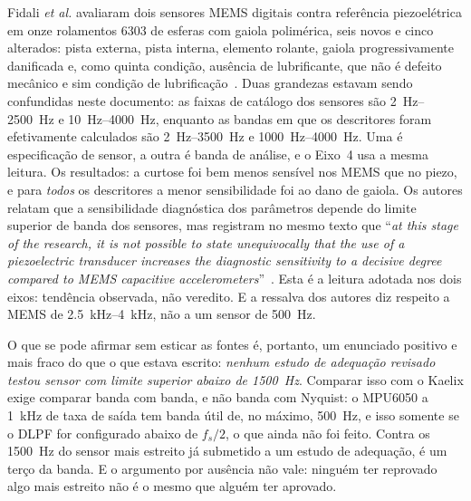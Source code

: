 \documentclass[11pt,a4paper]{article}
\begin{document}
Fidali \emph{et al.} avaliaram dois sensores MEMS digitais contra referência
piezoelétrica em onze rolamentos 6303 de esferas com gaiola polimérica, seis novos e
cinco alterados: pista externa, pista interna, elemento rolante, gaiola progressivamente
danificada e, como quinta condição, ausência de lubrificante, que não é defeito mecânico e
sim condição de lubrificação~\cite{fidali2024}. Duas grandezas estavam sendo confundidas
neste documento: as faixas de catálogo dos sensores são
\SIrange{2}{2500}{\hertz} e \SIrange{10}{4000}{\hertz}, enquanto as bandas em que os
descritores foram efetivamente calculados são \SIrange{2}{3500}{\hertz} e
\SIrange{1000}{4000}{\hertz}. Uma é especificação de sensor, a outra é banda de análise, e
o Eixo~4 usa a mesma leitura. Os resultados: a curtose foi bem menos sensível nos MEMS que
no piezo, e para \emph{todos} os descritores a menor sensibilidade foi ao dano de gaiola.
Os autores relatam que a sensibilidade diagnóstica dos parâmetros depende do limite
superior de banda dos sensores, mas registram no mesmo texto que ``\textit{at this stage
of the research, it is not possible to state unequivocally that the use of a piezoelectric
transducer increases the diagnostic sensitivity to a decisive degree compared to MEMS
capacitive accelerometers}''~\cite{fidali2024}. Esta é a leitura adotada nos dois eixos:
tendência observada, não veredito. E a ressalva dos autores diz respeito a MEMS de
\SIrange{2,5}{4}{\kilo\hertz}, não a um sensor de \SI{500}{\hertz}.

O que se pode afirmar sem esticar as fontes é, portanto, um enunciado positivo e mais
fraco do que o que estava escrito: \emph{nenhum estudo de adequação revisado testou sensor
com limite superior abaixo de \SI{1500}{\hertz}}. Comparar isso com o Kaelix exige
comparar banda com banda, e não banda com Nyquist: o MPU6050 a \SI{1}{\kilo\hertz} de taxa
de saída tem banda útil de, no máximo, \SI{500}{\hertz}, e isso somente se o DLPF for
configurado abaixo de $f_s/2$, o que ainda não foi feito. Contra os \SI{1500}{\hertz}
do sensor mais estreito já submetido a um estudo de adequação, é um terço da banda. E o
argumento por ausência não vale: ninguém ter reprovado algo mais estreito não é o mesmo
que alguém ter aprovado.
\end{document}
